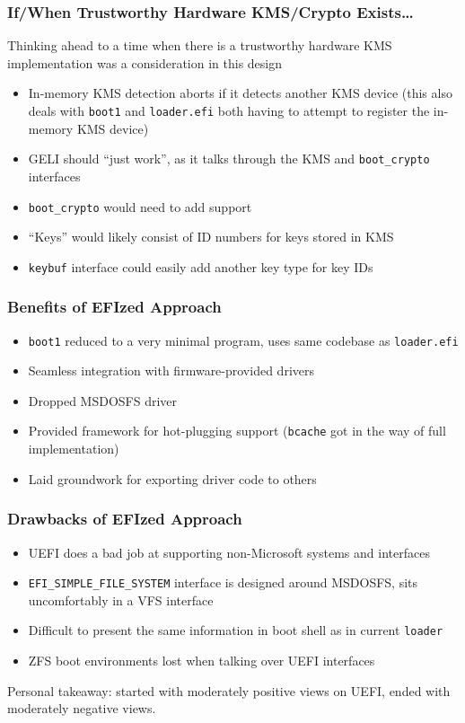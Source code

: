 \documentclass{beamer}
\begin{document}
\begin{frame}
  \frametitle{If/When Trustworthy Hardware KMS/Crypto Exists\ldots}
  Thinking ahead to a time when there is a trustworthy hardware KMS
  implementation was a consideration in this design
  \begin{itemize}
  \item In-memory KMS detection aborts if it detects another KMS
    device (this also deals with \texttt{boot1} and
    \texttt{loader.efi} both having to attempt to register the
    in-memory KMS device)
  \item GELI should ``just work'', as it talks through the KMS and
    \texttt{boot\_crypto} interfaces
  \item \texttt{boot\_crypto} would need to add support
  \item ``Keys'' would likely consist of ID numbers for keys stored in
    KMS
  \item \texttt{keybuf} interface could easily add another key type for key IDs
  \end{itemize}
\end{frame}

\begin{frame}
  \frametitle{Benefits of EFIzed Approach}
  \begin{itemize}
  \item \texttt{boot1} reduced to a very minimal program, uses same
    codebase as \texttt{loader.efi}
  \item Seamless integration with firmware-provided drivers
  \item Dropped MSDOSFS driver
  \item Provided framework for hot-plugging support (\texttt{bcache}
    got in the way of full implementation)
  \item Laid groundwork for exporting driver code to others
  \end{itemize}
\end{frame}

\begin{frame}
  \frametitle{Drawbacks of EFIzed Approach}
  \begin{itemize}
  \item UEFI does a bad job at supporting non-Microsoft systems and
    interfaces
  \item \texttt{EFI\_SIMPLE\_FILE\_SYSTEM} interface is designed
    around MSDOSFS, sits uncomfortably in a VFS interface
  \item Difficult to present the same information in boot shell as in
    current \texttt{loader}
  \item ZFS boot environments lost when talking over UEFI interfaces
  \end{itemize}
  Personal takeaway: started with moderately positive views on UEFI,
  ended with moderately negative views.
\end{frame}
\end{document}
